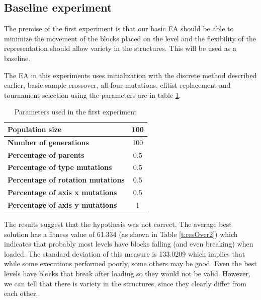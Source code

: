 \documentclass[a4paper,twoside]{article}
\newcommand{\myfloatalign}{\centering}
\begin{document}
\subsection{Baseline experiment}\label{E1}

The premise of the first experiment is that our basic EA should be able to 
minimize the movement of the blocks placed on the level and the flexibility of 
the representation should allow variety in the structures. This will
be used as a baseline.

The EA in this experiments uses initialization with the discrete
method described earlier, basic sample crossover, all four mutations,
elitist replacement and tournament selection using the parameters are in table \ref{t:base}.
%
\begin{table}
	\myfloatalign
	\caption{Parameters used in the first experiment} 
	\label{t:base}
	\begin{tabular}{lc}
		\hline
		\textbf{Population size} & 100 \\ \hline
		\textbf{Number of generations} & 100 \\  \hline
		\textbf{Percentage of parents} &  0.5 \\  \hline
		\textbf{Percentage of type mutations} & 0.5 \\  \hline
		\textbf{Percentage of rotation mutations} & 0.5 \\  \hline
		\textbf{Percentage of axis x mutations}  & 0.5 \\  \hline
		\textbf{Percentage of axis y mutations}  & 1 \\  \hline
	\end{tabular}
\end{table}


The results suggest that the hypothesis was not correct. The average best 
solution has a fitness value of 61.334 (as shown in Table \ref{t:resOver2}) 
which indicates that probably most levels have blocks falling (and even 
breaking) when loaded. The standard deviation of this measure is 133.0209 which 
implies that while some executions performed poorly, some others may be good. 
Even the best levels have blocks that break after loading so they would not be 
valid. However, we can tell that there is variety in the structures, since they 
clearly differ from each other. 
\end{document}
